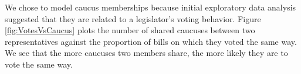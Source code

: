\documentclass{article}
\begin{document}
%



We chose to model caucus memberships because initial exploratory data analysis suggested that they are related to a legislator's voting behavior. Figure \ref{fig:VotesVsCaucus} plots the number of shared caucuses between two representatives against the proportion of bills on which they voted the same way. We see that the more caucuses two members share, the more likely they are to vote the same way. 
\end{document}
